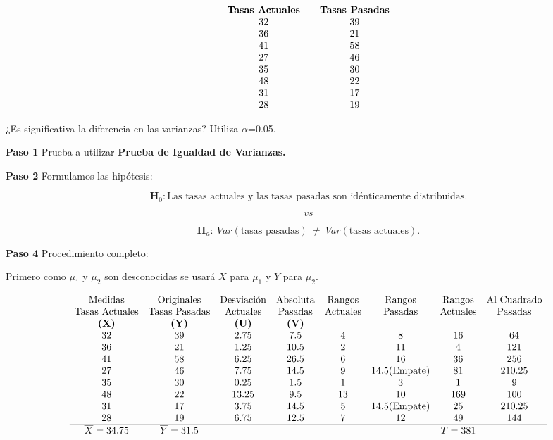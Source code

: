 \documentclass[
  a4paper,
  oneside,
  openany]{book}
\begin{document}
\[
\begin{array}{c c c} 
\textbf{Tasas Actuales} &  & \textbf{Tasas Pasadas} \\
32 & & 39 \\
36 & & 21 \\
41 & & 58 \\
27 & & 46 \\
35 & & 30 \\
48 & & 22 \\
31 & & 17 \\
28 & & 19 \\
\end{array}
\]

¿Es significativa la diferencia en las varianzas? Utiliza \(\alpha\)=0.05.

\textbf{Paso 1} Prueba a utilizar \textbf{Prueba de Igualdad de Varianzas.}

\textbf{Paso 2} Formulamos las hipótesis:

\[\textbf{H}_0: \mbox{Las tasas actuales y las tasas pasadas son idénticamente distribuidas.}\]

\[vs\]

\[\textbf{H}_a: \ Var(\mbox{tasas pasadas}) \ \neq  \ Var(\mbox{tasas actuales}).\]

\textbf{Paso 4} Procedimiento completo:

Primero como \(\mu_{1}\) y \(\mu_{2}\) son desconocidas se usará \(\overline{X}\) para \(\mu_{1}\) y \(\overline{Y}\) para \(\mu_{2}\).

\[
\begin{array}{c c c c c c c c }
\mbox{Medidas} & \mbox{Originales} & \mbox{Desviación} & \mbox{Absoluta} & \mbox{Rangos} & \mbox{Rangos} & \mbox{Rangos} & \mbox{Al Cuadrado} \\
\mbox{Tasas Actuales} & \mbox{Tasas Pasadas} & \mbox{Actuales} & \mbox{Pasadas} & \mbox{Actuales} & \mbox{Pasadas}& \mbox{Actuales} & \mbox{Pasadas} \\
\textbf{(X)} & \textbf{(Y)} & \textbf{(U)}   & \textbf{(V)}  &     &               &     &         \\
32  & 39  & 2.75  & 7.5  &  4  &  8            & 16  &  64         \\
36  & 21  & 1.25  & 10.5 &  2  &  11           &  4  &  121    \\
41  & 58  & 6.25  & 26.5 &  6 &   16           & 36  &  256       \\
27  & 46  & 7.75  & 14.5 &  9  &  14.5(\mbox{Empate})& 81  &  210.25       \\
35  & 30  & 0.25  & 1.5  &  1  &  3            & 1   &  9     \\
48  & 22  & 13.25 & 9.5  &  13 &  10           & 169 &  100    \\
31  & 17  & 3.75  & 14.5 &  5  &  14.5(\mbox{Empate})& 25  &  210.25     \\
28  & 19  & 6.75  & 12.5 &  7  &  12           & 49  &  144   \\
\hline
\overline{X}= 34.75 & \overline{Y}= 31.5 & & & & & T=381
\end{array}
\]
\end{document}
